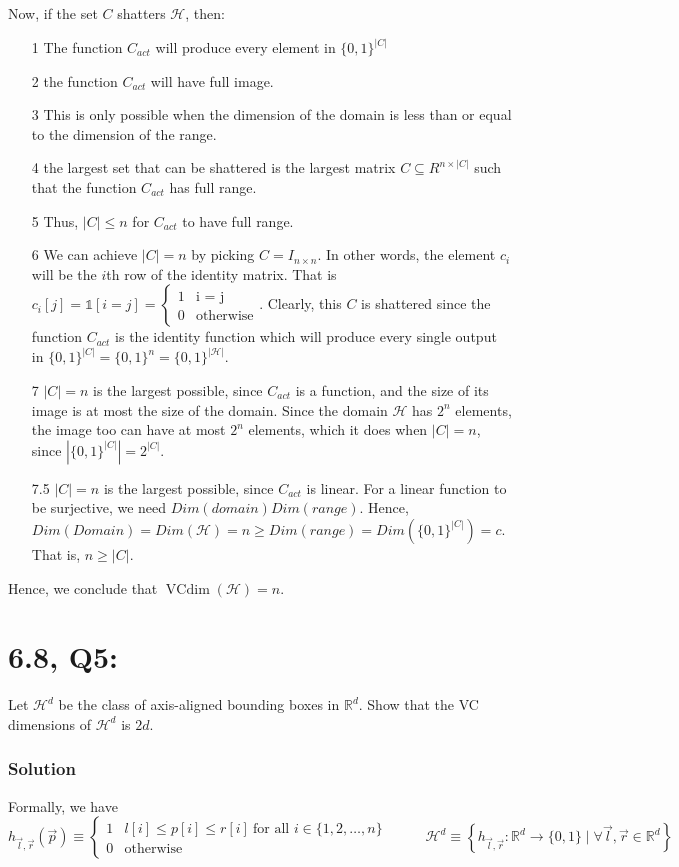 \documentclass[11pt]{article}
\newcommand{\R}{\ensuremath{\mathbb R}}
\renewcommand{\H}{\ensuremath{\mathcal{H}}}
\DeclareMathOperator{\vcdim}{VCdim}
\newcommand{\vc}{\ensuremath{\vcdim}}
\begin{document}
Now, if the set $C$ shatters $\H$, then:
\begin{itemize}
\item[1] The function $C_{act}$ will produce every element in $\{0, 1\}^{|C|}$
\item[2] the function $C_{act}$ will have full image. 
\item[3] This is  only possible when the dimension of the domain is less than or equal to the dimension of the range.
\item[4] the largest set that can be shattered is the largest matrix  $C \subseteq R^{n \times |C|}$  
         such that the function $C_{act}$ has full range.
\item[5] Thus, $|C| \leq n$ for $C_{act}$ to have full range.
\item[6] We can achieve $|C| = n$ by picking $C = I_{n \times n}$. In other words,
          the element $c_i$ will be the $i$th row of the identity matrix. That
          is $c_i[j] = \mathbb{1}[i = j] = \begin{cases} 1 & \text{i = j} \\ 0 & \text{otherwise} \end{cases}$.
         Clearly, this $C$ is shattered since the function $C_{act}$ is the identity function which
         will produce every single output in $\{0, 1\}^{|C|} = \{0, 1\}^n = \{0, 1\}^{|\H|}$.         
\item[7] $|C|=n$ is the largest possible, since $C_{act}$ is a function, and
         the size of its image is at most the size of the domain. Since the domain $\H$
         has $2^n$ elements, the image too can have at most $2^n$ elements, which
         it does when $|C| = n$, since $|\{0, 1\}^{|C|}| = 2^{|C|}$.
\item[7.5] $|C|=n$ is the largest possible, since $C_{act}$ is linear.
            For a linear function to be surjective, we need $Dim(domain)  Dim(range)$.
            Hence, $Dim(Domain) = Dim(\H) = n \geq Dim(range) = Dim(\{0, 1\}^{|C|}) = c$.
            That is, $n \geq |C|$.
\end{itemize}

Hence, we conclude that $\vc(\H) = n$.

\section*{6.8, Q5:}
Let $\H^d$ be the class of axis-aligned bounding boxes in $\R^d$. Show that
the VC dimensions of $\H^d$ is $2d$.


\subsubsection*{Solution}
Formally, we have 
$$
h_{\vec l, \vec r}(\vec p) \equiv
\begin{cases}
1 &  l[i] \leq p[i] \leq r[i]~\text{for all $i \in \{1, 2, \dots, n \}$ } \\
0 & \text{otherwise}
\end{cases} \qquad
\H^d \equiv \left\{ h_{\vec l, \vec r}: \R^d \rightarrow \{0, 1\} \mid \forall \vec l, \vec r \in \mathbb R^d \right\}
$$
\end{document}
